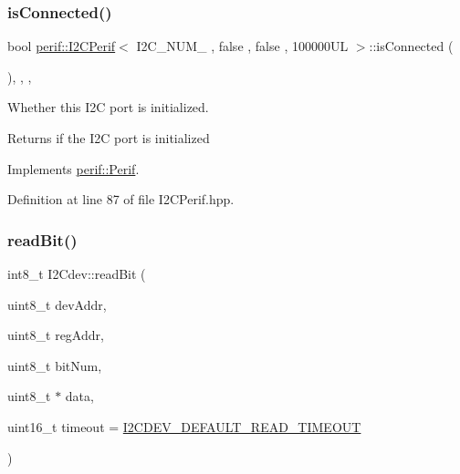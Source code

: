 \subsubsection{\texorpdfstring{isConnected()}{isConnected()}}
{\footnotesize\ttfamily bool \mbox{\hyperlink{classperif_1_1I2CPerif}{perif\+::\+I2\+C\+Perif}}$<$ I2\+C\+\_\+\+N\+U\+M\+\_ , false , false , 100000\+U\+L  $>$\+::is\+Connected (\begin{DoxyParamCaption}{ }\end{DoxyParamCaption})\hspace{0.3cm}{\ttfamily [inline]}, {\ttfamily [override]}, {\ttfamily [virtual]}, {\ttfamily [inherited]}}

Whether this I2C port is initialized.

\begin{DoxyReturn}{Returns}
if the I2C port is initialized 
\end{DoxyReturn}


Implements \mbox{\hyperlink{classperif_1_1Perif_ab9a17fad04e595f3ac0c78b9d3be4c9e}{perif\+::\+Perif}}.



Definition at line 87 of file I2\+C\+Perif.\+hpp.


\begin{DoxyCode}{0}

\end{DoxyCode}
\mbox{\label{classI2Cdev_ab028a4f330f4f31dc8af9890431a2a63}} 
\subsubsection{\texorpdfstring{readBit()}{readBit()}}
{\footnotesize\ttfamily int8\+\_\+t I2\+Cdev\+::read\+Bit (\begin{DoxyParamCaption}\item[{uint8\+\_\+t}]{dev\+Addr,  }\item[{uint8\+\_\+t}]{reg\+Addr,  }\item[{uint8\+\_\+t}]{bit\+Num,  }\item[{uint8\+\_\+t $\ast$}]{data,  }\item[{uint16\+\_\+t}]{timeout = {\ttfamily \mbox{\hyperlink{I2Cdev_8h_ad9726bb02451bb8f59d3d2729e4cd20e}{I2\+C\+D\+E\+V\+\_\+\+D\+E\+F\+A\+U\+L\+T\+\_\+\+R\+E\+A\+D\+\_\+\+T\+I\+M\+E\+O\+UT}}} }\end{DoxyParamCaption})\hspace{0.3cm}{\ttfamily [inherited]}}

